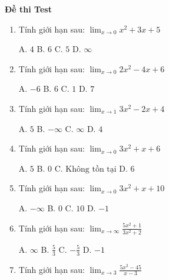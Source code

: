 \documentclass[12pt, a4paper]{article}
\begin{document}
\begin{center}
\Large\textbf{Đề thi Test}
\end{center}

\vspace{0.5cm}
\begin{enumerate}
    \item Tính giới hạn sau: $ \displaystyle \lim_{x \to 0} x^{2} + 3 x + 5 $

    A. $ 4 $ \qquad B. $ 6 $ \qquad C. $ 5 $ \qquad D. $ \infty $

    \vspace{0.3cm}

    \item Tính giới hạn sau: $ \displaystyle \lim_{x \to 0} 2 x^{2} - 4 x + 6 $

    A. $ -6 $ \qquad B. $ 6 $ \qquad C. $ 1 $ \qquad D. $ 7 $

    \vspace{0.3cm}

    \item Tính giới hạn sau: $ \displaystyle \lim_{x \to 1} 3 x^{2} - 2 x + 4 $

    A. $ 5 $ \qquad B. $ -\infty $ \qquad C. $ \infty $ \qquad D. $ 4 $

    \vspace{0.3cm}

    \item Tính giới hạn sau: $ \displaystyle \lim_{x \to 0} 3 x^{2} + x + 6 $

    A. $ 5 $ \qquad B. $ 0 $ \qquad C. $ \text{Không tồn tại} $ \qquad D. $ 6 $

    \vspace{0.3cm}

    \item Tính giới hạn sau: $ \displaystyle \lim_{x \to 0} 3 x^{2} + x + 10 $

    A. $ -\infty $ \qquad B. $ 0 $ \qquad C. $ 10 $ \qquad D. $ -1 $

    \vspace{0.3cm}

    \item Tính giới hạn sau: $ \displaystyle \lim_{x \to \infty} \frac{5 x^{2} + 1}{3 x^{2} + 2} $

    A. $ \infty $ \qquad B. $ \frac{5}{3} $ \qquad C. $ - \frac{5}{3} $ \qquad D. $ -1 $

    \vspace{0.3cm}

    \item Tính giới hạn sau: $ \displaystyle \lim_{x \to 3} \frac{5 x^{2} - 45}{x - 3} $


\end{enumerate}
\end{document}
